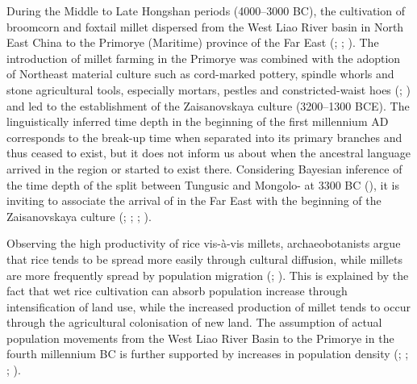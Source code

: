 \documentclass[output=paper,colorlinks,citecolor=brown]{langscibook}
\begin{document}
During the Middle to Late Hongshan periods (4000--3000 BC), the cultivation of broomcorn and foxtail millet dispersed from the West Liao River basin in North East China to the Primorye (Maritime) province of the  Far East (\citealt{Sergusheva2009}; \citealt{Leipe2019}; \citealt{Li2020}). The introduction of millet farming in the Primorye was combined with the adoption of Northeast  material culture such as cord-marked pottery, spindle whorls and stone agricultural tools, especially mortars, pestles and constricted-waist hoes (\citealt{Nelson2020}; \citealt{Li2020}) and led to the establishment of the Zaisanovskaya culture (3200--1300 BCE). The linguistically inferred time depth in the beginning of the first millennium AD corresponds to the break-up time when  separated into its primary branches and thus ceased to exist, but it does not inform us about when the ancestral language arrived in the region or started to exist there. Considering Bayesian inference of the time depth of the split between Tungusic and Mongolo- at 3300 BC (\citealt{RobbeetsBouckaert2018}), it is inviting to associate the arrival of  in the  Far East with the beginning of the Zaisanovskaya culture (\citealt{Mallory2019}; \citealt{WangRobbeets2020}; \citealt{Cui2020}; \citealt{Li2020}).

Observing the high productivity of rice vis-à-vis millets, archaeobotanists argue that rice tends to be spread more easily through cultural diffusion, while millets are more frequently spread by population migration (\citealt{Fuller2009}; \citealt{StevensFuller2017}). This is explained by the fact that wet rice cultivation can absorb population increase through intensification of land use, while the increased production of millet tends to occur through the agricultural colonisation of new land. The assumption of actual population movements from the West Liao River Basin to the Primorye in the fourth millennium BC is further supported by increases in population density (\citealt{Peterson2010}; \citealt{Miyamoto2014}; \citealt{Drennan2017}; \citealt{Leipe2019}).  
\end{document}
